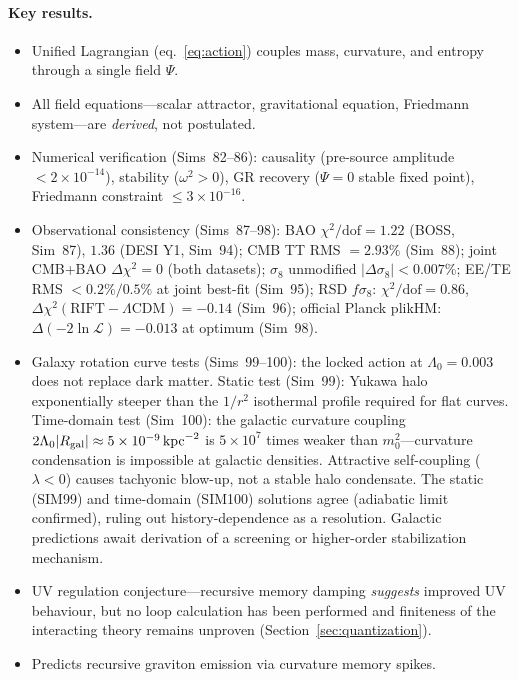 \documentclass[12pt,a4paper]{article}
\begin{document}
\paragraph{Key results.}
\begin{itemize}
  \item Unified Lagrangian (eq.~\eqref{eq:action}) couples mass, curvature, and entropy through a single field $\Psi$.
  \item All field equations---scalar attractor, gravitational equation, Friedmann system---are \emph{derived}, not postulated.
  \item Numerical verification (Sims~82--86): causality (pre-source amplitude $< 2\times 10^{-14}$), stability ($\omega^2 > 0$), GR recovery ($\Psi = 0$ stable fixed point), Friedmann constraint $\leq 3 \times 10^{-16}$.
  \item Observational consistency (Sims~87--98): BAO $\chi^2/\mathrm{dof} = 1.22$ (BOSS, Sim~87), $1.36$ (DESI Y1, Sim~94); CMB TT RMS $= 2.93\%$ (Sim~88); joint CMB+BAO $\Delta\chi^2 = 0$ (both datasets); $\sigma_8$ unmodified $|\Delta\sigma_8| < 0.007\%$; EE/TE RMS $< 0.2\%/0.5\%$ at joint best-fit (Sim~95); RSD $f\sigma_8$: $\chi^2/\mathrm{dof}=0.86$, $\Delta\chi^2(\mathrm{RIFT}-\Lambda\mathrm{CDM})=-0.14$ (Sim~96); official Planck plikHM: $\Delta(-2\ln\mathcal{L})=-0.013$ at optimum (Sim~98).
  \item Galaxy rotation curve tests (Sims~99--100): the locked action at $\Lambda_0=0.003$ does not replace dark matter.  Static test (Sim~99): Yukawa halo exponentially steeper than the $1/r^2$ isothermal profile required for flat curves.  Time-domain test (Sim~100): the galactic curvature coupling $2\Lambda_0|R_{\rm gal}|\approx5\times10^{-9}\,{\rm kpc}^{-2}$ is $5\times10^7$ times weaker than $m_0^2$---curvature condensation is impossible at galactic densities.  Attractive self-coupling ($\lambda<0$) causes tachyonic blow-up, not a stable halo condensate.  The static (SIM99) and time-domain (SIM100) solutions agree (adiabatic limit confirmed), ruling out history-dependence as a resolution.  Galactic predictions await derivation of a screening or higher-order stabilization mechanism.
  \item UV regulation conjecture---recursive memory damping \emph{suggests} improved UV behaviour, but no loop calculation has been performed and finiteness of the interacting theory remains unproven (Section~\ref{sec:quantization}).
  \item Predicts recursive graviton emission via curvature memory spikes.
\end{itemize}
\end{document}
